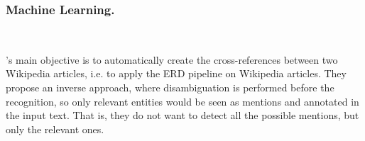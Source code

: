 \begin{comment}
\tick\nuevaHerramienta{\cite{zwicklbauer2016doser,zwicklbauer2016robust} DoSeR}
{2016}
{Agnostic}
{Collective (Joint)}
{Unknown}
{Manual + Dictionary}
{Weighted graph + Random walks}

\tick\nuevaHerramienta{\cite{torres2016} Kanopy4Tweets}
{2016}
{DBpedia}
{Collective (Joint) (Microposts)}
{Unknown}
{TwitIE}
{Weighted graph based on coherence between candidate entities}

\tick\nuevaHerramienta{\cite{hakimov2016} NERFGUN}
{2016}
{DBpedia + Wikipedia}
{Collective}
{-}
{-}
{NED only. Undirected probabilistic graphs}

\noindent\rule{\linewidth}{1px}

\end{comment}

\subsubsection{Machine Learning.}~

\cite{milne2008}'s main objective is to automatically create the cross-references between two Wikipedia articles, i.e. to apply the ERD pipeline on Wikipedia articles. They propose an inverse approach, where disambiguation is performed before the recognition, so only relevant entities would be seen as mentions and annotated in the input text. That is, they do not want to detect all the possible mentions, but only the relevant ones.

